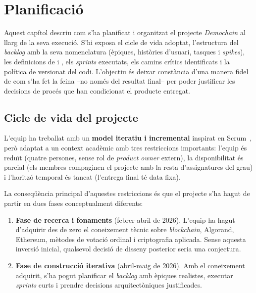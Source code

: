 

\chapter{Planificació}
\label{ch:planificacio}

Aquest capítol descriu com s'ha planificat i organitzat el projecte \emph{Demochain} al llarg de la seva execució.
S'hi exposa el cicle de vida adoptat, l'estructura del \emph{backlog} amb la seva nomenclatura (èpiques, històries
d'usuari, tasques i \emph{spikes}), les definicions de  i , els \emph{sprints} executats, els camins
crítics identificats i la política de versionat del codi.
L'objectiu és deixar constància d'una manera fidel de com s'ha fet la feina --no només del resultat final-- per poder
justificar les decisions de procés que han condicionat el producte entregat.



\section{Cicle de vida del projecte}
\label{sec:cicle-vida}

L'equip ha treballat amb un \textbf{model iteratiu i incremental} inspirat en Scrum~\cite{schwaber2020scrum}, però
adaptat a un context acadèmic amb tres restriccions importants: l'equip és reduït (quatre persones, sense rol de
\emph{product owner} extern), la disponibilitat és parcial (els membres compaginen el projecte amb la resta
d'assignatures del grau) i l'horitzó temporal és tancat (l'entrega final té data fixa).

La conseqüència principal d'aquestes restriccions és que el projecte s'ha hagut de partir en dues fases conceptualment
diferents:

\begin{enumerate}
    \item \textbf{Fase de recerca i fonaments} (febrer-abril de 2026).
    L'equip ha hagut d'adquirir des de zero el coneixement tècnic sobre \emph{blockchain}, Algorand, Ethereum, mètodes
    de votació ordinal i criptografia aplicada.
    Sense aquesta inversió inicial, qualsevol decisió de disseny posterior seria una conjectura.

    \item \textbf{Fase de construcció iterativa} (abril-maig de 2026).
    Amb el coneixement adquirit, s'ha pogut planificar el \emph{backlog} amb èpiques realistes, executar \emph{sprints}
    curts i prendre decisions arquitectòniques justificades.
\end{enumerate}

